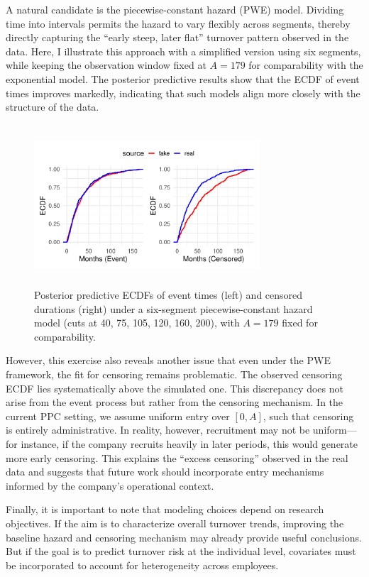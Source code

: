 A natural candidate is the piecewise-constant hazard (PWE) model. Dividing time into intervals permits the hazard to vary flexibly across segments, thereby directly capturing the “early steep, later flat” turnover pattern observed in the data. Here, I illustrate this approach with a simplified version using six segments, while keeping the observation window fixed at $A=179$ for comparability with the exponential model. The posterior predictive results show that the ECDF of event times improves markedly, indicating that such models align more closely with the structure of the data.
\begin{figure}[H]
    \centering
    \includegraphics[height=6cm, width=0.75\textwidth]{images/piece6_ecdf_comparison.pdf}
    \caption{{\small Posterior predictive ECDFs of event times (left) and censored durations (right) under a six-segment piecewise-constant hazard model (cuts at 40, 75, 105, 120, 160, 200), with $A=179$ fixed for comparability.}}
    \label{fig:ppc_map}
\end{figure}
However, this exercise also reveals another issue that even under the PWE framework, the fit for censoring remains problematic. The observed censoring ECDF lies systematically above the simulated one. This discrepancy does not arise from the event process but rather from the censoring mechanism. In the current PPC setting, we assume uniform entry over $[0, A]$, such that censoring is entirely administrative. In reality, however, recruitment may not be uniform—for instance, if the company recruits heavily in later periods, this would generate more early censoring. This explains the “excess censoring” observed in the real data and suggests that future work should incorporate entry mechanisms informed by the company’s operational context.

Finally, it is important to note that modeling choices depend on research objectives. If the aim is to characterize overall turnover trends, improving the baseline hazard and censoring mechanism may already provide useful conclusions. But if the goal is to predict turnover risk at the individual level, covariates must be incorporated to account for heterogeneity across employees.

